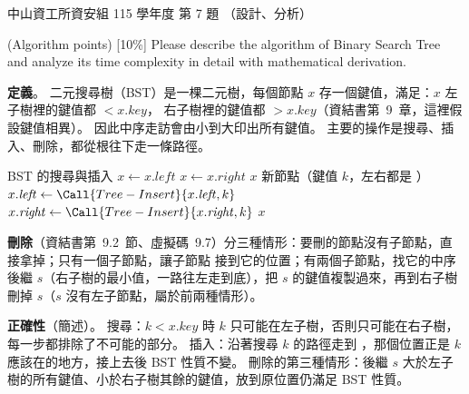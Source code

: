 \begin{pastexam}[label={px:nsysu-115-dmalg-06}]{中山資工所資安組 115 學年度 第 7 題}
（設計、分析）

(Algorithm points) {[}10\%{]} Please describe the algorithm of Binary Search Tree and analyze its time complexity in detail with mathematical derivation.
\end{pastexam}

\begin{pastsoln}
\textbf{定義}。 二元搜尋樹（BST）是一棵二元樹，每個節點 $x$ 存一個鍵值，滿足：$x$ 左子樹裡的鍵值都 $< x.\mathit{key}$，
右子樹裡的鍵值都 $> x.\mathit{key}$（資結書第~9~章，這裡假設鍵值相異）。 因此中序走訪會由小到大印出所有鍵值。
主要的操作是搜尋、插入、刪除，都從根往下走一條路徑。

\begin{pseudo}{BST 的搜尋與插入}
            \State $x \gets x.\mathit{left}$
        \Else
            \State $x \gets x.\mathit{right}$
        \EndIf
    \EndWhile
    \State \Return $x$ 
\EndFunction
\Statex
{} 
        \State \Return 新節點（鍵值 $k$，左右都是 \NIL）
    \EndIf
        \State $x.\mathit{left} \gets \Call{Tree-Insert}{x.\mathit{left}, k}$
    \Else
        \State $x.\mathit{right} \gets \Call{Tree-Insert}{x.\mathit{right}, k}$
    \EndIf
    \State \Return $x$
\EndFunction
\end{pseudo}

\textbf{刪除}（資結書第~9.2~節、虛擬碼~9.7）分三種情形：要刪的節點沒有子節點，直接拿掉；只有一個子節點，讓子節點
接到它的位置；有兩個子節點，找它的中序後繼 $s$（右子樹的最小值，一路往左走到底），把 $s$ 的鍵值複製過來，再到右子樹
刪掉 $s$（$s$ 沒有左子節點，屬於前兩種情形）。

\textbf{正確性}（簡述）。 搜尋：$k < x.\mathit{key}$ 時 $k$ 只可能在左子樹，否則只可能在右子樹，每一步都排除了不可能的部分。
插入：沿著搜尋 $k$ 的路徑走到 \NIL，那個位置正是 $k$ 應該在的地方，接上去後 BST 性質不變。 刪除的第三種情形：後繼 $s$
大於左子樹的所有鍵值、小於右子樹其餘的鍵值，放到原位置仍滿足 BST 性質。


\end{pastsoln}
